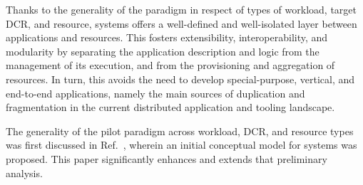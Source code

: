 \documentclass{sig-alternate}
\begin{document}


Thanks to the generality of the \pilot paradigm in respect of types of workload,
target DCR, and resource, \pilot systems offers a well-defined and well-isolated
layer between applications and resources. This fosters extensibility,
interoperability, and modularity by separating the application description and
logic from the management of its execution, and from the provisioning and
aggregation of resources. In turn, this avoids the need to develop
special-purpose, vertical, and end-to-end applications, namely the main sources
of duplication and fragmentation in the current distributed application and
tooling landscape.



The generality of the pilot paradigm across workload, DCR, and resource types
was first discussed in Ref.~\cite{luckow2012}, wherein an initial conceptual
model for \pilot systems was proposed. This paper significantly enhances and
extends that preliminary analysis.

 

\end{document}
